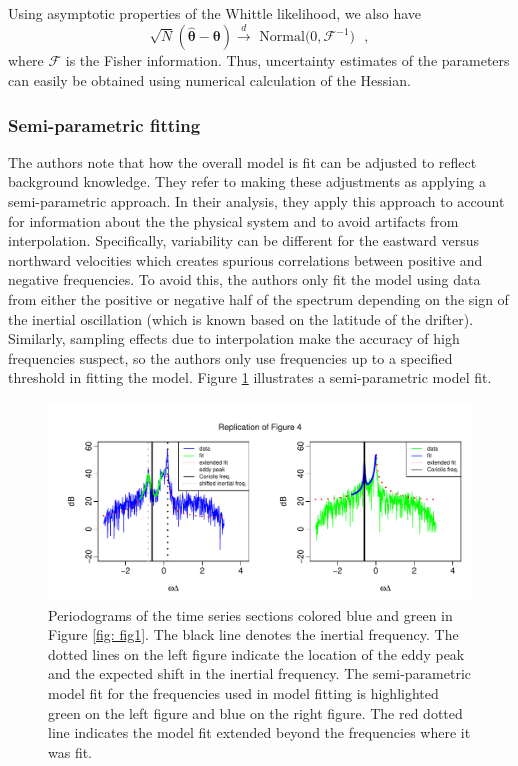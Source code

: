 \documentclass{stat572Style}
\begin{document}
Using asymptotic properties of the Whittle likelihood, we also have 
\begin{equation}
\label{eq: fisher}
\sqrt{N}(\hat{\boldsymbol{\theta}} - \boldsymbol{\theta}) \overset{d}{\rightarrow} \text{ Normal($0, \boldsymbol{\mathcal{F}}^{-1})$ },
\end{equation}
where $\boldsymbol{\mathcal{F}}$ is the Fisher information. 
Thus, uncertainty estimates of the parameters can easily be obtained using numerical calculation of the Hessian. 

\subsubsection{Semi-parametric fitting}
\label{sec: semi}
The authors note that how the overall model is fit can be adjusted to reflect background knowledge.
They refer to making these adjustments as applying a semi-parametric approach.  
In their analysis, they apply this approach to account for information about the the physical system and to avoid artifacts from interpolation. 
Specifically,  variability can be different for the eastward versus northward velocities  which creates spurious correlations between positive and negative frequencies. 
To avoid this, the authors only fit the model using data from either the positive or negative half of the spectrum depending on the sign of the inertial oscillation (which is known based on the latitude of the drifter).  
Similarly, sampling effects due to interpolation make the accuracy of high frequencies suspect, so the authors only use frequencies up to a specified threshold in fitting the model. Figure \ref{fig: fig4} illustrates a semi-parametric model fit. 

\begin{figure}[h!]
  \centering
    \includegraphics[width=.95\textwidth]{ReplicatedFigures/fig4.pdf}
        \caption{Periodograms of the time series sections colored blue and green in Figure \ref{fig: fig1}. The black line denotes the inertial frequency.   The dotted lines on the left figure indicate the location of the eddy peak and the expected shift in the inertial frequency. The semi-parametric model fit for the frequencies used in model fitting is highlighted green on the left figure and blue on the right figure. The red dotted line indicates the model fit extended beyond the frequencies where it was fit. }
        	\label{fig: fig4}
\end{figure}
\end{document}
